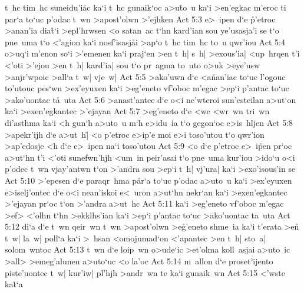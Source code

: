 t~hc
tim~hc
suneidu'i\r{a}c
ka`i
t~hc
gunaik`oc
a>u\r{t}o~u
ka`i
>en'egkac
m'eroc
ti
par`a
to`uc
p'odac
t~wn
>apost'olwn
>'ejhken\bibvsend
\vs Act 5:3
e>~ipen
d`e
\r{p}'etroc
>anan'ia
dia\r{t}`i
>epl'hrwsen
<o
satan~ac
t`hn
kard'ian
sou
ye'usasja'i
se
t`o
pne~uma
t`o
<'agion
ka`i
nosf'isasj\r{a}i
>ap`o
t~hc
tim~hc
to~u
qwr'iou\bibvsend
\vs Act 5:4
o>uq`i
m'enon
so`i
>'emenen
ka`i
praj`en
>en
t~h|
s~h|
>exous'ia|
<up~hrqen
t'i
<'oti
>'ejou
>en
t~h|
kard'ia|
sou
t`o
pr~agma
to~uto
o>uk
>eye'usw
>anjr'wpoic
>all`a
t~w|
vje~w|\bibvsend
\vs Act 5:5
>ako'uwn
d`e
<a\r{n}an'iac
to`uc
l'ogouc
to'utouc
pes`wn
>ex'eyuxen
ka`i
>eg'eneto
vf'oboc
m'egac
>ep`i
p'antac
to`uc
>ako'uontac
t\r{a}~uta\bibvsend
{}
\vs Act 5:6
>anast'antec
d`e
o<i
ne'wteroi
sun'esteilan
a>ut`on
ka`i
>exen'egkantec
>'ejayan\bibvsend
\vs Act 5:7
>eg'eneto
d`e
<wc
<wr~wn
tri~wn
di'asthma
ka`i
<h
gun`h
a>uto~u
m`h
e>idu~ia
t`o
gegon`oc
e>is~hljen\bibvsend
\vs Act 5:8
>apekr'ijh
d`e
a>ut~h|\r{}
<o
p'etroc
e>ip'e
moi
e>i
toso'utou
t`o
qwr'ion
>ap'edosje
<h
d`e
e>~ipen
na`i
toso'utou\bibvsend
\vs Act 5:9
<o
d`e
p'etroc
e>~i\r{p}en
pr`oc
a>ut`hn
t'i
<'oti
sunefwn'hjh
<um~in
peir'asai
t`o
pne~uma
kur'iou
>ido`u
o<i
p'odec
t~wn
vjay'antwn
t`on
>'andra
sou
>ep`i
t~h|
vj'ura|
ka`i
>exo'isous'in
se\bibvsend
\vs Act 5:10
>'epesen
d`e
paraqr~hma
p\r{a}r`a
to`uc
p'odac
a>uto~u
ka`i
>ex'eyuxen
e>iselj'ontec
d`e
o<i
nean'iskoi
e<~uron
a>ut`hn
nekr`an
ka`i
>exen'egkantec
>'ejayan
pr`oc
t`on
>'andra
a>ut~hc\bibvsend
\vs Act 5:11
ka`i
>eg'eneto
vf'oboc
m'egac
>ef>
<'olhn
t`hn
>ekklhs'ian
ka`i
>ep`i
p'antac
to`uc
>ako'uontac
ta~uta\bibvsend
\vs Act 5:12
di`a
d`e
t~wn
qeir~wn
t~wn
>apost'olwn
>e\r{g}'eneto
shme~ia
ka`i
t'erata
>en\r{}
t~w|
la~w|
poll`a
ka`i
>~hsan
<omojumad`on
<'apantec
>en
t~h|
sto~a|
solom~wntoc\bibvsend
\vs Act 5:13
t~wn
d`e
loip~wn
o>ude`ic
>et'olma
koll~asjai
a>uto~ic
>all>
>emeg'alunen
a>uto`uc
<o
la'oc\bibvsend
\vs Act 5:14
m~allon
d`e
proset'ijento
piste'uontec
t~w|
kur'iw|
pl'hjh
>andr~wn
te
ka`i
gunaik~wn\bibvsend
\vs Act 5:15
<'wste
ka\r{t}`a
